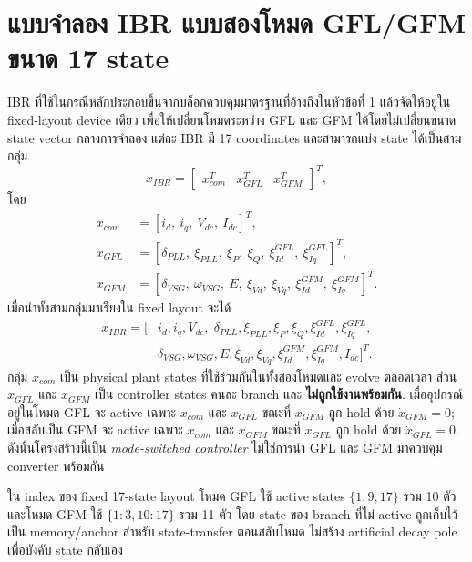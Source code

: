 \documentclass[12pt,a4paper]{article}
\begin{document}
\section{แบบจำลอง IBR แบบสองโหมด GFL/GFM ขนาด 17 state}
IBR ที่ใช้ในกรณีหลักประกอบขึ้นจากบล็อกควบคุมมาตรฐานที่อ้างถึงในหัวข้อที่ 1 แล้วจัดให้อยู่ใน fixed-layout device เดียว เพื่อให้เปลี่ยนโหมดระหว่าง GFL และ GFM ได้โดยไม่เปลี่ยนขนาด state vector กลางการจำลอง แต่ละ IBR มี 17 coordinates และสามารถแบ่ง state ได้เป็นสามกลุ่ม
\begin{equation}
 x_{IBR}=\begin{bmatrix}x_{com}^{T}&x_{GFL}^{T}&x_{GFM}^{T}\end{bmatrix}^{T},
\label{eq:ibr_partition}
\end{equation}
โดย
\begin{align}
x_{com}&=[i_d,\ i_q,\ V_{dc},\ I_{dc}]^T,\\
x_{GFL}&=[\delta_{PLL},\ \xi_{PLL},\ \xi_P,\ \xi_Q,\ \xi_{Id}^{GFL},\ \xi_{Iq}^{GFL}]^T,\\
x_{GFM}&=[\delta_{VSG},\ \omega_{VSG},\ E,\ \xi_{Vd},\ \xi_{Vq},\ \xi_{Id}^{GFM},\ \xi_{Iq}^{GFM}]^T.
\label{eq:ibr_groups}
\end{align}
เมื่อนำทั้งสามกลุ่มมาเรียงใน fixed layout จะได้
\begin{equation}
\begin{aligned}
x_{IBR}=[&i_d,i_q,V_{dc},\;\delta_{PLL},\xi_{PLL},\xi_P,\xi_Q,\xi_{Id}^{GFL},\xi_{Iq}^{GFL},\\
&\delta_{VSG},\omega_{VSG},E,\xi_{Vd},\xi_{Vq},\xi_{Id}^{GFM},\xi_{Iq}^{GFM},I_{dc}]^T.
\end{aligned}
\label{eq:ibr17}
\end{equation}
กลุ่ม $x_{com}$ เป็น physical plant states ที่ใช้ร่วมกันในทั้งสองโหมดและ evolve ตลอดเวลา ส่วน $x_{GFL}$ และ $x_{GFM}$ เป็น controller states คนละ branch และ \textbf{ไม่ถูกใช้งานพร้อมกัน}. เมื่ออุปกรณ์อยู่ในโหมด GFL จะ active เฉพาะ $x_{com}$ และ $x_{GFL}$ ขณะที่ $x_{GFM}$ ถูก hold ด้วย $\dot x_{GFM}=0$; เมื่อสลับเป็น GFM จะ active เฉพาะ $x_{com}$ และ $x_{GFM}$ ขณะที่ $x_{GFL}$ ถูก hold ด้วย $\dot x_{GFL}=0$. ดังนั้นโครงสร้างนี้เป็น \emph{mode-switched controller} ไม่ใช่การนำ GFL และ GFM มาควบคุม converter พร้อมกัน

ใน index ของ fixed 17-state layout โหมด GFL ใช้ active states $\{1{:}9,17\}$ รวม 10 ตัว และโหมด GFM ใช้ $\{1{:}3,10{:}17\}$ รวม 11 ตัว โดย state ของ branch ที่ไม่ active ถูกเก็บไว้เป็น memory/anchor สำหรับ state-transfer ตอนสลับโหมด ไม่สร้าง artificial decay pole เพื่อบังคับ state กลับเอง
\end{document}
